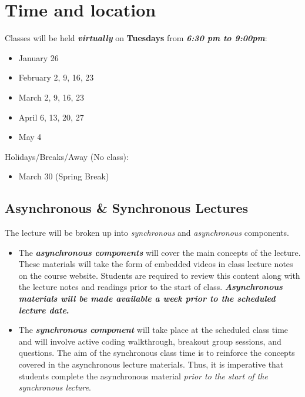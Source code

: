 \documentclass[
  12pt,
]{article}
\providecommand{\tightlist}{%
  \setlength{\itemsep}{0pt}\setlength{\parskip}{0pt}}
\begin{document}
\hypertarget{time-and-location}{%
\section{Time and location}\label{time-and-location}}

Classes will be held \textbf{\emph{virtually}} on \textbf{Tuesdays} from
\textbf{\emph{6:30 pm to 9:00pm}}:

\begin{itemize}
\tightlist
\item
  January 26
\item
  February 2, 9, 16, 23
\item
  March 2, 9, 16, 23
\item
  April 6, 13, 20, 27
\item
  May 4
\end{itemize}

Holidays/Breaks/Away (No class):

\begin{itemize}
\tightlist
\item
  March 30 (Spring Break)
\end{itemize}

\hypertarget{asynchronous-synchronous-lectures}{%
\subsection{Asynchronous \& Synchronous
Lectures}\label{asynchronous-synchronous-lectures}}

The lecture will be broken up into \emph{synchronous} and
\emph{asynchronous} components.

\begin{itemize}
\tightlist
\item
  The \textbf{\emph{asynchronous components}} will cover the main
  concepts of the lecture. These materials will take the form of
  embedded videos in class lecture notes on the course website. Students
  are required to review this content along with the lecture notes and
  readings prior to the start of class. \textbf{\emph{Asynchronous
  materials will be made available a \textbf{week prior} to the
  scheduled lecture date}.}
\item
  The \textbf{\emph{synchronous component}} will take place at the
  scheduled class time and will involve active coding walkthrough,
  breakout group sessions, and questions. The aim of the synchronous
  class time is to reinforce the concepts covered in the asynchronous
  lecture materials. Thus, it is imperative that students complete the
  asynchronous material \emph{prior to the start of the synchronous
  lecture}.
\end{itemize}
\end{document}
